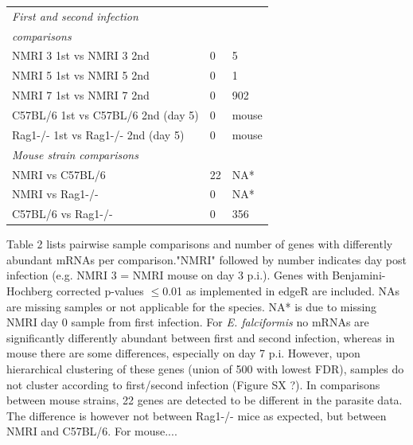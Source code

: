 \documentclass{bmcart}
\begin{document}
\begin{table}[H]
\begin{center}
\begin{tabular}{*3l}
\textit{First and second infection} & 		 & 	 \\ 
\textit{comparisons} 	    & 		& 	\\ \midrule
	NMRI 3 1st vs NMRI 3 2nd  	& 0  & 5 \\
	NMRI 5 1st vs NMRI 5 2nd  	& 0  & 1 \\
	NMRI 7 1st vs NMRI 7 2nd  	& 0  & 902 \\
	C57BL/6 1st vs C57BL/6 2nd (day 5) & 0 &  mouse \\
	Rag1-/- 1st vs Rag1-/- 2nd (day 5) & 0 & mouse  \\ \midrule
\textit{Mouse strain comparisons} & 		 & 	 \\ \midrule
	NMRI vs C57BL/6 		& 22 	& NA* \\		
	NMRI vs Rag1-/-     		& 0 & NA* 	\\
	C57BL/6 vs Rag1-/-  		& 0   & 356 	\\ \midrule
\bottomrule
	\hline
\end{tabular}
\end{center}
\end{table}

Table 2 lists pairwise sample comparisons and number of genes with
differently abundant mRNAs per comparison."NMRI" followed by number
indicates day post infection (e.g. NMRI 3 = NMRI mouse on day 3
p.i.). Genes with Benjamini-Hochberg corrected p-values $\leq$0.01 as
implemented in edgeR are included. NAs are missing samples or not
applicable for the species. NA* is due to missing NMRI day 0 sample
from first infection. For \textit{E. falciformis} no mRNAs are
significantly differently abundant between first and second infection,
whereas in mouse there are some differences, especially on day 7
p.i. However, upon hierarchical clustering of these genes (union of
500 with lowest FDR), samples do not cluster according to first/second
infection (Figure SX ?). In comparisons between mouse strains, 22
genes are detected to be different in the parasite data. The
difference is however not between Rag1-/- mice as expected, but
between NMRI and C57BL/6. For mouse....


\clearpage
\end{document}
